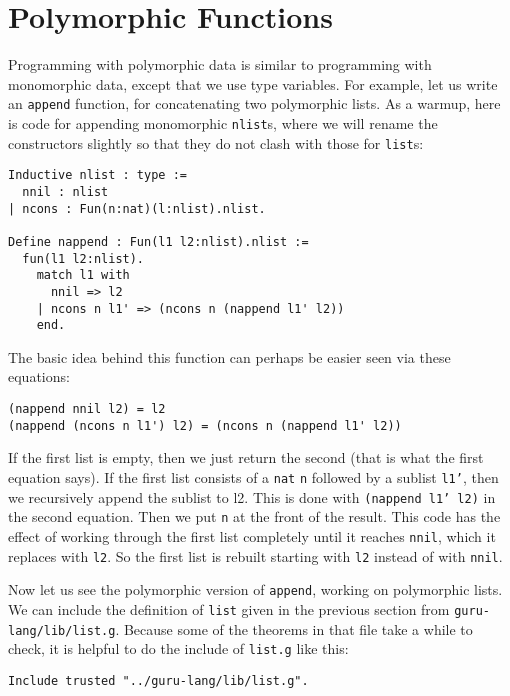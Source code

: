 \documentclass{book}[12pt]
\begin{document}
\section{Polymorphic Functions}
\label{ch6:func}

Programming with polymorphic data is similar to programming with
monomorphic data, except that we use type variables.  For example, let
us write an \texttt{append} function, for concatenating two
polymorphic lists.  As a warmup, here is code for appending
monomorphic \texttt{nlist}s, where we will rename the constructors
slightly so that they do not clash with those for \texttt{list}s:

\begin{verbatim}
Inductive nlist : type :=
  nnil : nlist
| ncons : Fun(n:nat)(l:nlist).nlist.

Define nappend : Fun(l1 l2:nlist).nlist :=
  fun(l1 l2:nlist).
    match l1 with
      nnil => l2
    | ncons n l1' => (ncons n (nappend l1' l2))
    end.
\end{verbatim}

\noindent The basic idea behind this function can perhaps be easier
seen via these equations:

\begin{verbatim}
(nappend nnil l2) = l2
(nappend (ncons n l1') l2) = (ncons n (nappend l1' l2))
\end{verbatim}

\noindent If the first list is empty, then we just return the second
(that is what the first equation says).  If the first list consists of
a \texttt{nat} \texttt{n} followed by a sublist \texttt{l1'}, then we
recursively append the sublist to l2.  This is done with
\texttt{(nappend l1' l2)} in the second equation.  Then we put
\texttt{n} at the front of the result.  This code has the effect of
working through the first list completely until it reaches
\texttt{nnil}, which it replaces with \texttt{l2}.  So the first list
is rebuilt starting with \texttt{l2} instead of with \texttt{nnil}.

Now let us see the polymorphic version of \texttt{append}, working on
polymorphic lists.  We can include the definition of \texttt{list}
given in the previous section from \texttt{guru-lang/lib/list.g}.  Because
some of the theorems in that file take a while to check, it is helpful
to do the include of \texttt{list.g} like this:

\begin{verbatim}
Include trusted "../guru-lang/lib/list.g".
\end{verbatim}
\end{document}
